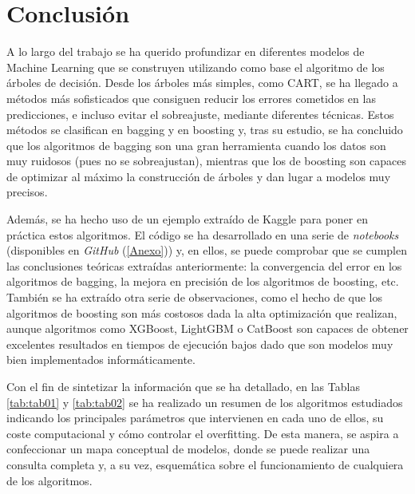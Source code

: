 \documentclass[12pt,twoside]{article}
\begin{document}
\newpage
\section{Conclusión}
A lo largo del trabajo se ha querido profundizar en diferentes modelos de Machine Learning que se construyen utilizando como base el algoritmo de los árboles de decisión. Desde los árboles más simples, como CART, se ha llegado a métodos más sofisticados que consiguen reducir los errores cometidos en las predicciones, e incluso evitar el sobreajuste, mediante diferentes técnicas. Estos métodos se clasifican en bagging y en boosting y, tras su estudio, se ha concluido que los algoritmos de bagging son una gran herramienta cuando los datos son muy ruidosos (pues no se sobreajustan), mientras que los de boosting son capaces de optimizar al máximo la construcción de árboles y dan lugar a modelos muy precisos.

Además, se ha hecho uso de un ejemplo extraído de Kaggle para poner en práctica estos algoritmos. El código se ha desarrollado en una serie de \textit{notebooks} (disponibles en \textit{GitHub} (\ref{Anexo})) y, en ellos, se puede comprobar que se cumplen las conclusiones teóricas extraídas anteriormente: la convergencia del error en los algoritmos de bagging, la mejora en precisión de los algoritmos de boosting, etc. También se ha extraído otra serie de observaciones, como el hecho de que los algoritmos de boosting son más costosos dada la alta optimización que realizan, aunque algoritmos como XGBoost, LightGBM o CatBoost son capaces de obtener excelentes resultados en tiempos de ejecución bajos dado que son modelos muy bien implementados informáticamente. 

Con el fin de sintetizar la información que se ha detallado, en las Tablas \ref{tab:tab01} y \ref{tab:tab02} se ha realizado un resumen de los algoritmos estudiados indicando los principales parámetros que intervienen en cada uno de ellos, su coste computacional y cómo controlar el overfitting. De esta manera, se aspira a confeccionar un mapa conceptual de modelos, donde se puede realizar una consulta completa y, a su vez, esquemática sobre el funcionamiento de cualquiera de los algoritmos.
\end{document}
